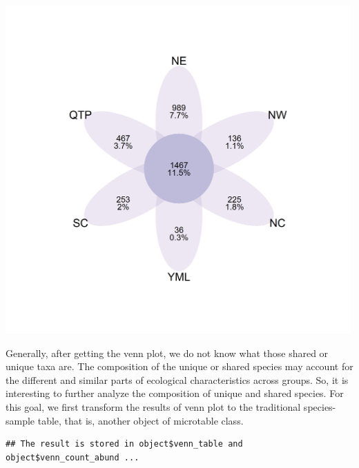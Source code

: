 \documentclass[
]{book}
\newenvironment{Shaded}{\begin{snugshade}}{\end{snugshade}}
\newcommand{\AttributeTok}[1]{\textcolor[rgb]{0.77,0.63,0.00}{#1}}
\newcommand{\FunctionTok}[1]{\textcolor[rgb]{0.00,0.00,0.00}{#1}}
\newcommand{\NormalTok}[1]{#1}
\newcommand{\OtherTok}[1]{\textcolor[rgb]{0.56,0.35,0.01}{#1}}
\newcommand{\SpecialCharTok}[1]{\textcolor[rgb]{0.00,0.00,0.00}{#1}}
\newcommand{\StringTok}[1]{\textcolor[rgb]{0.31,0.60,0.02}{#1}}
\begin{document}
\begin{center}\includegraphics[width=500px]{Images/trans_venn_2} \end{center}

Generally, after getting the venn plot, we do not know what those shared or unique taxa are.
The composition of the unique or shared species may account for the different and similar parts of ecological characteristics across groups\citep{Mendes_Deciphering_2011}.
So, it is interesting to further analyze the composition of unique and shared species.
For this goal, we first transform the results of venn plot to the traditional species-sample table, that is, another object of microtable class.

\begin{Shaded}
\end{Shaded}

\begin{verbatim}
## The result is stored in object$venn_table and object$venn_count_abund ...
\end{verbatim}
\end{document}
